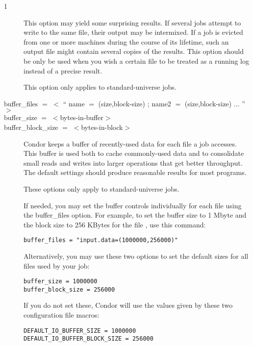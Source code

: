\begin{ManPage}{\label{man-condor-submit}}{1}
\begin{description}
This option may yield some surprising results.  If several
jobs attempt to write to the same file, their output may be intermixed.
If a job is evicted from one or more machines during the course of its
lifetime, such an output file might contain several copies of the results.
This option should be only be used when you wish a certain file to be
treated as a running log instead of a precise result.

This option only applies to standard-universe jobs.


\item[buffer\_files $=$ $<$ `` name $=$ (size,block-size) ; name2 $=$ (size,block-size) ... '' $>$ ]
\item[buffer\_size $=$ $<$bytes-in-buffer$>$]
\item[buffer\_block\_size $=$ $<$bytes-in-block$>$]
Condor keeps a buffer of recently-used data for each file a job accesses.
This buffer is used both to cache commonly-used data and to consolidate small
reads and writes into larger operations that get better throughput.
The default settings should produce reasonable results for most programs.

These options only apply to standard-universe jobs.

If needed, you may set the buffer controls individually for each file using
the buffer\_files option. For example, to set the buffer size to 1 Mbyte and
the block size to 256 KBytes for the file , use this command:

\begin{verbatim}
buffer_files = "input.data=(1000000,256000)"
\end{verbatim}

Alternatively, you may use these two options to set
the default sizes for all files used by your job:

\begin{verbatim}
buffer_size = 1000000
buffer_block_size = 256000
\end{verbatim}

If you do not set these, Condor will use the values given by these
two configuration file macros:

\begin{verbatim}
DEFAULT_IO_BUFFER_SIZE = 1000000
DEFAULT_IO_BUFFER_BLOCK_SIZE = 256000
\end{verbatim}


\end{description}
\end{ManPage}

